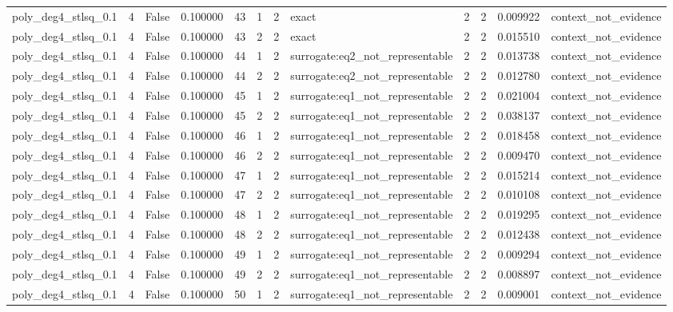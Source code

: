 \begin{tabular}{lrrrrrrlrrrl}
poly\_deg4\_stlsq\_0.1 & 4 & False & 0.100000 & 43 & 1 & 2 & exact & 2 & 2 & 0.009922 & context\_not\_evidence \\
poly\_deg4\_stlsq\_0.1 & 4 & False & 0.100000 & 43 & 2 & 2 & exact & 2 & 2 & 0.015510 & context\_not\_evidence \\
poly\_deg4\_stlsq\_0.1 & 4 & False & 0.100000 & 44 & 1 & 2 & surrogate:eq2\_not\_representable & 2 & 2 & 0.013738 & context\_not\_evidence \\
poly\_deg4\_stlsq\_0.1 & 4 & False & 0.100000 & 44 & 2 & 2 & surrogate:eq2\_not\_representable & 2 & 2 & 0.012780 & context\_not\_evidence \\
poly\_deg4\_stlsq\_0.1 & 4 & False & 0.100000 & 45 & 1 & 2 & surrogate:eq1\_not\_representable & 2 & 2 & 0.021004 & context\_not\_evidence \\
poly\_deg4\_stlsq\_0.1 & 4 & False & 0.100000 & 45 & 2 & 2 & surrogate:eq1\_not\_representable & 2 & 2 & 0.038137 & context\_not\_evidence \\
poly\_deg4\_stlsq\_0.1 & 4 & False & 0.100000 & 46 & 1 & 2 & surrogate:eq1\_not\_representable & 2 & 2 & 0.018458 & context\_not\_evidence \\
poly\_deg4\_stlsq\_0.1 & 4 & False & 0.100000 & 46 & 2 & 2 & surrogate:eq1\_not\_representable & 2 & 2 & 0.009470 & context\_not\_evidence \\
poly\_deg4\_stlsq\_0.1 & 4 & False & 0.100000 & 47 & 1 & 2 & surrogate:eq1\_not\_representable & 2 & 2 & 0.015214 & context\_not\_evidence \\
poly\_deg4\_stlsq\_0.1 & 4 & False & 0.100000 & 47 & 2 & 2 & surrogate:eq1\_not\_representable & 2 & 2 & 0.010108 & context\_not\_evidence \\
poly\_deg4\_stlsq\_0.1 & 4 & False & 0.100000 & 48 & 1 & 2 & surrogate:eq1\_not\_representable & 2 & 2 & 0.019295 & context\_not\_evidence \\
poly\_deg4\_stlsq\_0.1 & 4 & False & 0.100000 & 48 & 2 & 2 & surrogate:eq1\_not\_representable & 2 & 2 & 0.012438 & context\_not\_evidence \\
poly\_deg4\_stlsq\_0.1 & 4 & False & 0.100000 & 49 & 1 & 2 & surrogate:eq1\_not\_representable & 2 & 2 & 0.009294 & context\_not\_evidence \\
poly\_deg4\_stlsq\_0.1 & 4 & False & 0.100000 & 49 & 2 & 2 & surrogate:eq1\_not\_representable & 2 & 2 & 0.008897 & context\_not\_evidence \\
poly\_deg4\_stlsq\_0.1 & 4 & False & 0.100000 & 50 & 1 & 2 & surrogate:eq1\_not\_representable & 2 & 2 & 0.009001 & context\_not\_evidence \\

\end{tabular}
